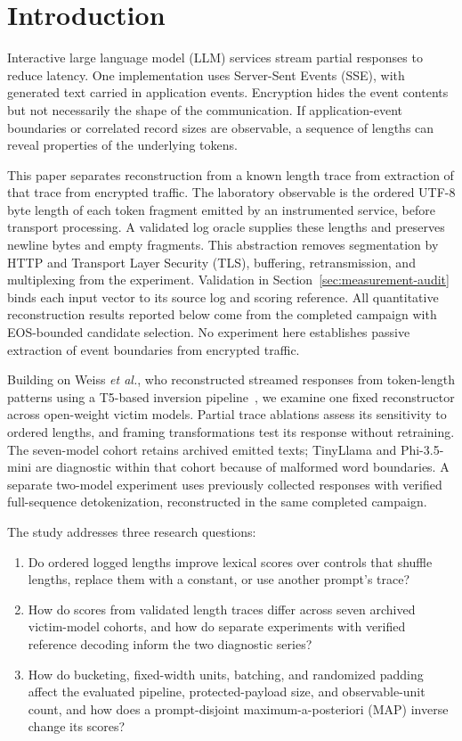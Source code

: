 \documentclass[electronics,article,submit,pdftex,moreauthors]{Definitions/mdpi}
\begin{document}
\section{Introduction}
Interactive large language model (LLM) services stream partial responses to reduce latency. One implementation uses Server-Sent Events (SSE), with generated text carried in application events. Encryption hides the event contents but not necessarily the shape of the communication. If application-event boundaries or correlated record sizes are observable, a sequence of lengths can reveal properties of the underlying tokens.

This paper separates reconstruction from a known length trace from extraction of that trace from encrypted traffic. The laboratory observable is the ordered UTF-8 byte length of each token fragment emitted by an instrumented service, before transport processing. A validated log oracle supplies these lengths and preserves newline bytes and empty fragments. This abstraction removes segmentation by HTTP and Transport Layer Security (TLS), buffering, retransmission, and multiplexing from the experiment. Validation in Section~\ref{sec:measurement-audit} binds each input vector to its source log and scoring reference. All quantitative reconstruction results reported below come from the completed campaign with EOS-bounded candidate selection. No experiment here establishes passive extraction of event boundaries from encrypted traffic.

Building on Weiss \emph{et al.}, who reconstructed streamed responses from token-length patterns using a T5-based inversion pipeline~\cite{weiss2024prompt}, we examine one fixed reconstructor across open-weight victim models. Partial trace ablations assess its sensitivity to ordered lengths, and framing transformations test its response without retraining. The seven-model cohort retains archived emitted texts; TinyLlama and Phi-3.5-mini are diagnostic within that cohort because of malformed word boundaries. A separate two-model experiment uses previously collected responses with verified full-sequence detokenization, reconstructed in the same completed campaign.

The study addresses three research questions:
\begin{enumerate}[label=\textbf{RQ\arabic*:},leftmargin=4.2em,labelwidth=3.2em,labelsep=0.6em]
    \item Do ordered logged lengths improve lexical scores over controls that shuffle lengths, replace them with a constant, or use another prompt's trace?
    \item How do scores from validated length traces differ across seven archived victim-model cohorts, and how do separate experiments with verified reference decoding inform the two diagnostic series?
    \item How do bucketing, fixed-width units, batching, and randomized padding affect the evaluated pipeline, protected-payload size, and observable-unit count, and how does a prompt-disjoint maximum-a-posteriori (MAP) inverse change its scores?
\end{enumerate}
\end{document}
